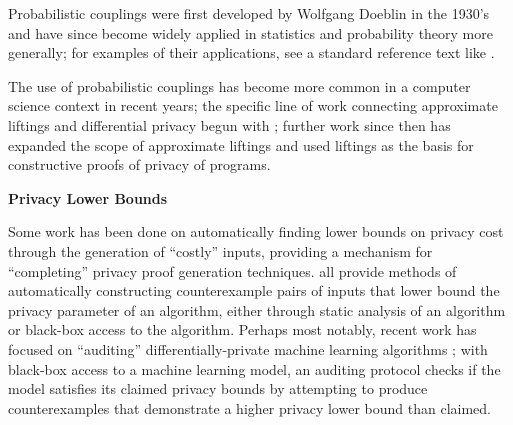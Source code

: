 Probabilistic couplings were first developed by Wolfgang Doeblin in the 1930's and have since become widely applied in statistics and probability theory more generally; for examples of their applications, see a standard reference text like \cite{lindvallLecturesCouplingMethod2002}. 

The use of probabilistic couplings has become more common in a computer science context in recent years; the specific line of work connecting approximate liftings and differential privacy begun with \cite{bartheProvingDifferentialPrivacy2016}; 
further work since then has expanded the scope of approximate liftings \cite{bartheRelationalStarLiftings2019,hsuProbabilisticCouplingsProbabilistic2017} and used liftings as the basis for constructive proofs of privacy of programs\cite{albarghouthiSynthesizingCouplingProofs2017,albarghouthiConstraintBasedSynthesisCoupling2018}.


\textbf{Privacy Lower Bounds}

Some work has been done on automatically finding lower bounds on privacy cost through the generation of ``costly'' inputs, providing a mechanism for ``completing'' privacy proof generation techniques. 
\cite{bichselDPFinderFindingDifferential2018,bichselDPSniperBlackBoxDiscovery2021,dingDetectingViolationsDifferential2018,niuDPOptIdentifyHigh2022} all provide methods of automatically constructing counterexample pairs of inputs that lower bound the privacy parameter of an algorithm, either through static analysis of an algorithm or black-box access to the algorithm. 
Perhaps most notably, recent work has focused on ``auditing'' differentially-private machine learning algorithms \cite{luGeneralFrameworkAuditing2022,loknaGroupAttackAuditing2023,loknaGroupAttackAuditing2023,steinkePrivacyAuditingOne2023}; with black-box access to a machine learning model, an auditing protocol checks if the model satisfies its claimed privacy bounds by attempting to produce counterexamples that demonstrate a higher privacy lower bound than claimed. 
